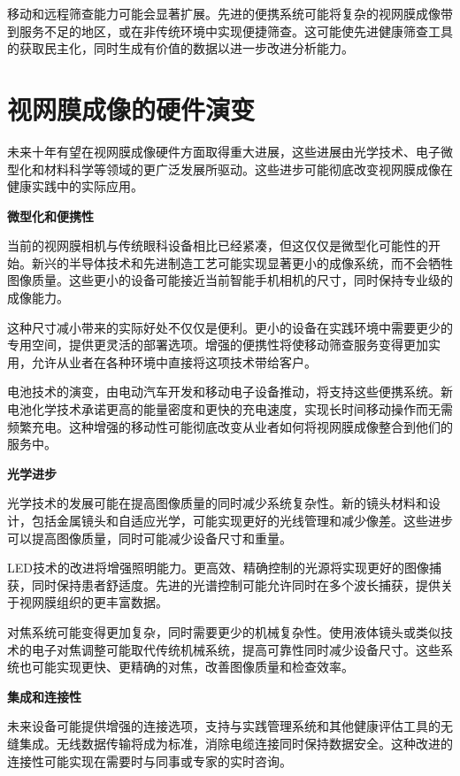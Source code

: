 \documentclass[
  Letterpaper,
]{scrbook}
\begin{document}
移动和远程筛查能力可能会显著扩展。先进的便携系统可能将复杂的视网膜成像带到服务不足的地区，或在非传统环境中实现便捷筛查。这可能使先进健康筛查工具的获取民主化，同时生成有价值的数据以进一步改进分析能力。

\section{视网膜成像的硬件演变}\label{ux89c6ux7f51ux819cux6210ux50cfux7684ux786cux4ef6ux6f14ux53d8}

未来十年有望在视网膜成像硬件方面取得重大进展，这些进展由光学技术、电子微型化和材料科学等领域的更广泛发展所驱动。这些进步可能彻底改变视网膜成像在健康实践中的实际应用。

\textbf{微型化和便携性}

当前的视网膜相机与传统眼科设备相比已经紧凑，但这仅仅是微型化可能性的开始。新兴的半导体技术和先进制造工艺可能实现显著更小的成像系统，而不会牺牲图像质量。这些更小的设备可能接近当前智能手机相机的尺寸，同时保持专业级的成像能力。

这种尺寸减小带来的实际好处不仅仅是便利。更小的设备在实践环境中需要更少的专用空间，提供更灵活的部署选项。增强的便携性将使移动筛查服务变得更加实用，允许从业者在各种环境中直接将这项技术带给客户。

电池技术的演变，由电动汽车开发和移动电子设备推动，将支持这些便携系统。新电池化学技术承诺更高的能量密度和更快的充电速度，实现长时间移动操作而无需频繁充电。这种增强的移动性可能彻底改变从业者如何将视网膜成像整合到他们的服务中。

\textbf{光学进步}

光学技术的发展可能在提高图像质量的同时减少系统复杂性。新的镜头材料和设计，包括金属镜头和自适应光学，可能实现更好的光线管理和减少像差。这些进步可以提高图像质量，同时可能减少设备尺寸和重量。

LED技术的改进将增强照明能力。更高效、精确控制的光源将实现更好的图像捕获，同时保持患者舒适度。先进的光谱控制可能允许同时在多个波长捕获，提供关于视网膜组织的更丰富数据。

对焦系统可能变得更加复杂，同时需要更少的机械复杂性。使用液体镜头或类似技术的电子对焦调整可能取代传统机械系统，提高可靠性同时减少设备尺寸。这些系统也可能实现更快、更精确的对焦，改善图像质量和检查效率。

\textbf{集成和连接性}

未来设备可能提供增强的连接选项，支持与实践管理系统和其他健康评估工具的无缝集成。无线数据传输将成为标准，消除电缆连接同时保持数据安全。这种改进的连接性可能实现在需要时与同事或专家的实时咨询。
\end{document}
